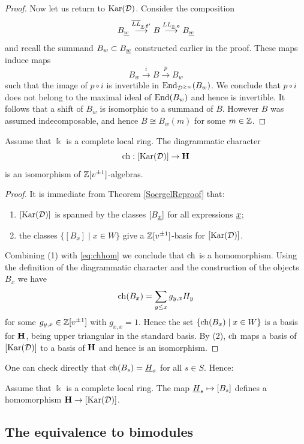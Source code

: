 \begin{proof}
Now let us return to $\textrm{Kar}({\mathcal{D}})$. Consider the composition
\[
B_{\underline{w}} \stackrel{\overline{LL}_{{\underline{x}},{\mathbf f}'}}{\longrightarrow} B \stackrel{LL_{\underline{x},{\mathbf e}}}{\longrightarrow} B_{\underline{w}}
\]
and recall the summand $B_w \subset B_{\underline{w}}$ constructed earlier in the proof. These maps induce maps
\[
B_w \stackrel{i}{\to} B \stackrel{p}{\to} B_w
\]
such that the image of $p \circ i$ is invertible in $\operatorname{End}_{{\mathcal{D}}^{\ge w}}(B_w)$. We conclude that $p \circ i$ does not belong to the maximal ideal of $\operatorname{End}(B_w)$ and hence is invertible. It follows that a shift of $B_w$ is isomorphic to a summand of $B$. However $B$ was assumed indecomposable, and hence $B \cong B_w(m)$ for some $m \in {\mathbb{Z}}$. \end{proof}

\begin{cor}Assume that $\Bbbk$ is a complete local ring. The diagrammatic character
\[ \operatorname{ch} : [\textrm{Kar}({\mathcal{D}})] \rightarrow {\mathbf H} \]
is an isomorphism of ${\mathbb{Z}}[v^{\pm 1}]$-algebras.
\end{cor}

\begin{proof}
It is immediate from Theorem \ref{SoergelReproof} that:
\begin{enumerate}
\item $[\textrm{Kar}({\mathcal{D}})]$ is spanned by the classes $[B_{\underline{x}}]$ for all expressions $\underline{x}$;
\item the classes $\{ [B_x] \; | \; x \in W \}$ give a ${\mathbb{Z}}[v^{\pm 1}]$-basis for $[\textrm{Kar}({\mathcal{D}})]$.
\end{enumerate}
Combining (1) with \eqref{eq:chhom} we conclude that $\operatorname{ch}$ is a homomorphism. Using the definition of the diagrammatic character and the construction of the objects $B_x$ we have
\[
\operatorname{ch}(B_x) = \sum_{y \le x} g_{y,x} H_y
\]
for some $g_{y,x} \in {\mathbb{Z}}[v^{\pm 1}]$ with $g_{x,x} = 1$. Hence the set $\{ \operatorname{ch}(B_x) \; | \; x \in W \}$ is a basis for ${\mathbf H}$, being upper triangular in the standard basis. By (2), $\operatorname{ch}$ maps a basis of $[\textrm{Kar}({\mathcal{D}})]$ to a basis of ${\mathbf H}$ and hence is an isomorphism.
\end{proof}

One can check directly that $\operatorname{ch}(B_s) = \underline{H}_s$ for all $s \in S$. Hence:

\begin{cor} \label{cor:homto[B]}
Assume that $\Bbbk$ is a complete local ring. The map $\underline{H}_s \mapsto [B_s]$ defines a homomorphism ${\mathbf H} \rightarrow [\textrm{Kar}({\mathcal{D}})]$.\end{cor}

\subsection{The equivalence to bimodules}

